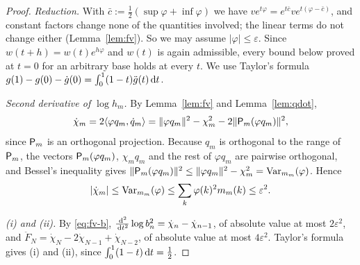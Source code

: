 \begin{proof}
\emph{Reduction.} With $\bar c:=\frac12(\sup\varphi+\inf\varphi)$ we have $ve^{t\varphi}=e^{t\bar c}ve^{t(\varphi-\bar
c)}$, and constant factors change none of the quantities involved; the linear terms do not change either
(Lemma~\ref{lem:fv}). So we may assume $|\varphi|\le\varepsilon$. Since $w(t+h)=w(t)e^{h\varphi}$ and $w(t)$ is again
admissible, every bound below proved at $t=0$ for an arbitrary base holds at every $t$. We use Taylor's formula
$g(1)-g(0)-\dot g(0)=\int_0^1(1-t)\ddot g(t)\,\mathrm{d} t$.

\emph{Second derivative of $\log h_m$.} By Lemma~\ref{lem:fv} and Lemma~\ref{lem:qdot},
\[
  \dot\chi_m=2\langle\varphi q_m,\dot q_m\rangle=\|\varphi q_m\|^2-\chi_m^2-2\|\mathsf{P}_m(\varphi q_m)\|^2,
\]
since $\mathsf{P}_m$ is an orthogonal projection. Because $q_m$ is orthogonal to the range of $\mathsf{P}_m$, the vectors
$\mathsf{P}_m(\varphi q_m)$, $\chi_mq_m$ and the rest of $\varphi q_m$ are pairwise orthogonal, and Bessel's inequality
gives $\|\mathsf{P}_m(\varphi q_m)\|^2\le\|\varphi q_m\|^2-\chi_m^2=\operatorname{Var}_{m_m}(\varphi)$. Hence
\[
  |\dot\chi_m|\le\operatorname{Var}_{m_m}(\varphi)\le\sum_k\varphi(k)^2m_m(k)\le\varepsilon^2 .
\]

\emph{(i) and (ii).} By \eqref{eq:fv-b}, $\frac{\,\mathrm{d}^2}{\,\mathrm{d} t^2}\log b_n^2=\dot\chi_n-\dot\chi_{n-1}$, of absolute
value at most $2\varepsilon^2$, and $\ddot F_N=\dot\chi_N-2\dot\chi_{N-1}+\dot\chi_{N-2}$, of absolute value at most
$4\varepsilon^2$. Taylor's formula gives (i) and (ii), since $\int_0^1(1-t)\,\mathrm{d} t=\frac12$.


\end{proof}
